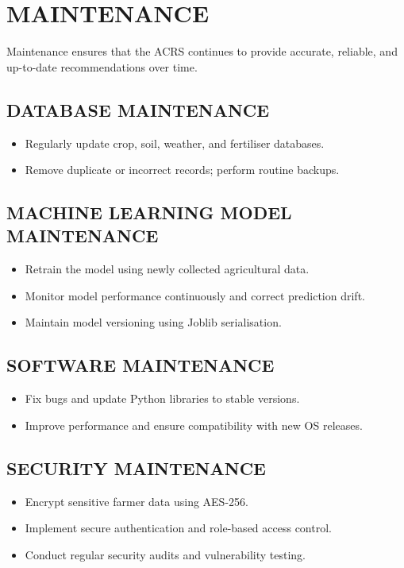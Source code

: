 \documentclass[12pt,a4paper,oneside]{report}
\begin{document}
\chapter{MAINTENANCE}

Maintenance ensures that the ACRS continues to provide accurate, reliable, and up-to-date recommendations over time.

\section{DATABASE MAINTENANCE}
\begin{itemize}[leftmargin=*, label=$\bullet$]
  \item Regularly update crop, soil, weather, and fertiliser databases.
  \item Remove duplicate or incorrect records; perform routine backups.
\end{itemize}

\section{MACHINE LEARNING MODEL MAINTENANCE}
\begin{itemize}[leftmargin=*, label=$\bullet$]
  \item Retrain the model using newly collected agricultural data.
  \item Monitor model performance continuously and correct prediction drift.
  \item Maintain model versioning using Joblib serialisation.
\end{itemize}

\section{SOFTWARE MAINTENANCE}
\begin{itemize}[leftmargin=*, label=$\bullet$]
  \item Fix bugs and update Python libraries to stable versions.
  \item Improve performance and ensure compatibility with new OS releases.
\end{itemize}

\section{SECURITY MAINTENANCE}
\begin{itemize}[leftmargin=*, label=$\bullet$]
  \item Encrypt sensitive farmer data using AES-256.
  \item Implement secure authentication and role-based access control.
  \item Conduct regular security audits and vulnerability testing.
\end{itemize}
\end{document}
